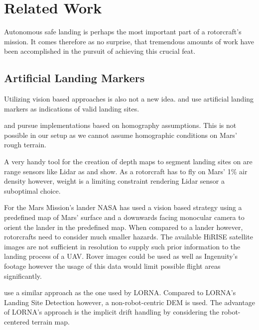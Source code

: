 \chapter{Related Work}
\label{sec:relwork}

Autonomous safe landing is perhaps the most important part of a rotorcraft's mission. It comes therefore as no surprise, that tremendous amounts of work have been accomplished in the pursuit of achieving this crucial feat. 

\section{Artificial Landing Markers}

Utilizing vision based approaches is also not a new idea. \citep{Saripalli2002VisionBasedLanding,Falanga2017QuadrotorLanding} and \citep{Mu2023VisionBasedLanding} use artificial landing markers as indications of valid landing sites. 

\citep{Bosch2006AutonomousDetection,Brockers2011AutonomousLanding,Desaraju2015VisionBased} and \citep{Brockers2014TowardsAutonomous} pursue implementations based on homography assumptions. This is not possible in our setup as we cannot assume homographic conditions on Mars' rough terrain.

A very handy tool for the creation of depth maps to segment landing sites on are range sensors like Lidar as \citep{Trawny2015FlightTesting, Luna2017Evaluation, Johnson2002LidarBased} and \citep{Scherer2012AutonomousLanding} show. As a rotorcraft has to fly on Mars' 1\% air density however, weight is a limiting constraint rendering Lidar sensor a suboptimal choice.

For the Mars Mission's lander NASA has used a vision based strategy using a predefined map of Mars' surface and a downwards facing monocular camera to orient the lander in the predefined map\citep{Johnson2020Mars2020}. When compared to a lander however, rotorcrafts need to consider much smaller hazards. The available HiRISE satellite images are not sufficient in resolution to supply such prior information to the landing process of a UAV. Rover images could be used as well as Ingenuity's footage however the usage of this data would limit possible flight areas significantly.

\citep{Johnson2005VisionGuided} use a similar approach as the one used by LORNA. Compared to LORNA's Landing Site Detection \citep{LSD1,LSD2} however, a non-robot-centric DEM is used. The advantage of LORNA's approach is the implicit drift handling by considering the robot-centered terrain map.

